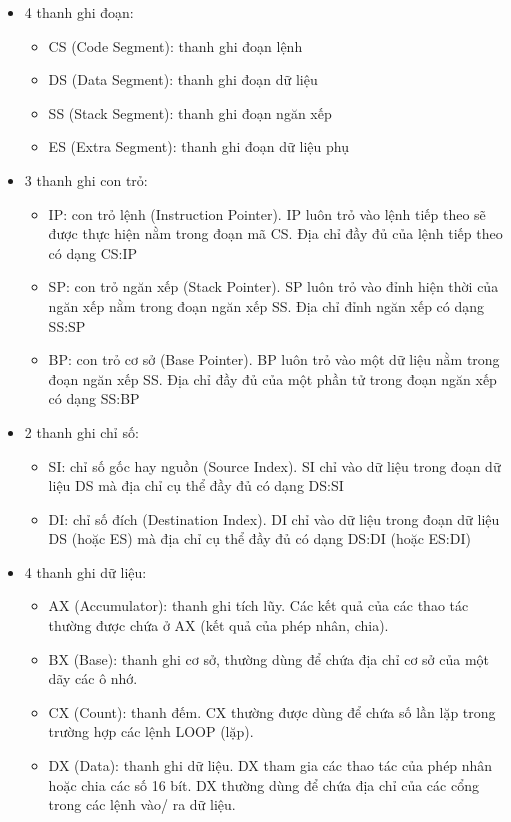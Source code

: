 \documentclass[../report.tex]{subfiles}
\begin{document}
\begin{itemize}
    \item 4 thanh ghi đoạn:
        \begin{itemize}
            \item CS (Code Segment): thanh ghi đoạn lệnh
            \item DS (Data Segment): thanh ghi đoạn dữ liệu
            \item SS (Stack Segment): thanh ghi đoạn ngăn xếp
            \item ES (Extra Segment): thanh ghi đoạn dữ liệu phụ
        \end{itemize}
        
    \item 3 thanh ghi con trỏ:
    \begin{itemize}
            \item IP: con trỏ lệnh (Instruction Pointer). IP luôn trỏ vào lệnh tiếp theo sẽ được thực hiện
nằm trong đoạn mã CS. Địa chỉ đầy đủ của lệnh tiếp theo có dạng CS:IP
            \item SP: con trỏ ngăn xếp (Stack Pointer). SP luôn trỏ vào đỉnh hiện thời của ngăn xếp nằm
trong đoạn ngăn xếp SS. Địa chỉ đỉnh ngăn xếp có dạng SS:SP
         \item BP: con trỏ cơ sở (Base Pointer). BP luôn trỏ vào một dữ liệu nằm trong đoạn ngăn
xếp SS. Địa chỉ đầy đủ của một phần tử trong đoạn ngăn xếp có dạng SS:BP
    \end{itemize}

    \item 2 thanh ghi chỉ số:
    \begin{itemize}
            \item SI: chỉ số gốc hay nguồn (Source Index). SI chỉ vào dữ liệu trong đoạn dữ liệu DS mà
địa chỉ cụ thể đầy đủ có dạng DS:SI
            \item DI: chỉ số đích (Destination Index). DI chỉ vào dữ liệu trong đoạn dữ liệu DS (hoặc
ES) mà địa chỉ cụ thể đầy đủ có dạng DS:DI (hoặc ES:DI) 
        \end{itemize}
    \item 4 thanh ghi dữ liệu:
    \begin{itemize}
            \item AX (Accumulator): thanh ghi tích lũy. Các kết quả của các thao tác thường được chứa
ở AX (kết quả của phép nhân, chia).
            \item BX (Base): thanh ghi cơ sở, thường dùng để chứa địa chỉ cơ sở của một dãy các ô nhớ. 
            \item CX (Count): thanh đếm. CX thường được dùng để chứa số lần lặp trong trường hợp
các lệnh LOOP (lặp). 
            \item DX (Data): thanh ghi dữ liệu. DX tham gia các thao tác của phép nhân hoặc chia các
số 16 bít. DX thường dùng để chứa địa chỉ của các cổng trong các lệnh vào/ ra dữ liệu.
        \end{itemize}


\end{itemize}
\end{document}
